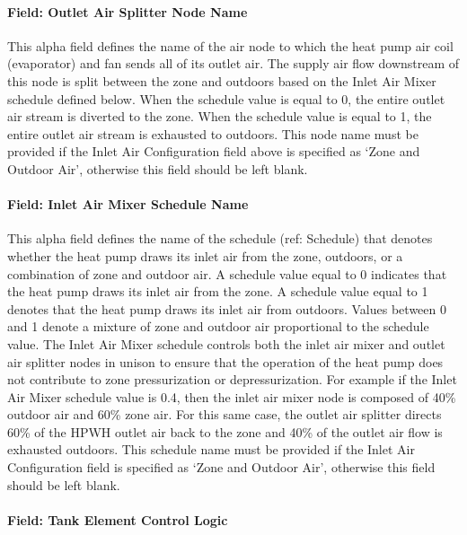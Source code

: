 \paragraph{Field: Outlet Air Splitter Node Name}\label{field-outlet-air-splitter-node-name-1}

This alpha field defines the name of the air node to which the heat pump air coil (evaporator) and fan sends all of its outlet air. The supply air flow downstream of this node is split between the zone and outdoors based on the Inlet Air Mixer schedule defined below. When the schedule value is equal to 0, the entire outlet air stream is diverted to the zone. When the schedule value is equal to 1, the entire outlet air stream is exhausted to outdoors. This node name must be provided if the Inlet Air Configuration field above is specified as `Zone and Outdoor Air', otherwise this field should be left blank.

\paragraph{Field: Inlet Air Mixer Schedule Name}\label{field-inlet-air-mixer-schedule-name-1}

This alpha field defines the name of the schedule (ref: Schedule) that denotes whether the heat pump draws its inlet air from the zone, outdoors, or a combination of zone and outdoor air. A schedule value equal to 0 indicates that the heat pump draws its inlet air from the zone. A schedule value equal to 1 denotes that the heat pump draws its inlet air from outdoors. Values between 0 and 1 denote a mixture of zone and outdoor air proportional to the schedule value. The Inlet Air Mixer schedule controls both the inlet air mixer and outlet air splitter nodes in unison to ensure that the operation of the heat pump does not contribute to zone pressurization or depressurization. For example if the Inlet Air Mixer schedule value is 0.4, then the inlet air mixer node is composed of 40\% outdoor air and 60\% zone air. For this same case, the outlet air splitter directs 60\% of the HPWH outlet air back to the zone and 40\% of the outlet air flow is exhausted outdoors. This schedule name must be provided if the Inlet Air Configuration field is specified as `Zone and Outdoor Air', otherwise this field should be left blank.

\paragraph{Field: Tank Element Control Logic}\label{field-tank-element-control-logic-1}

